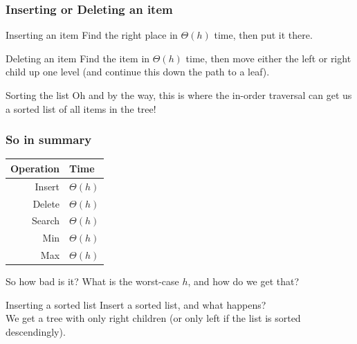\begin{frame}
	\frametitle{Inserting or Deleting an item}

	\begin{block}{Inserting an item}
		Find the right place in $\Theta(h)$ time, then put it there.
	\end{block}	

	\pause
	\begin{block}{Deleting an item}
		Find the item in $\Theta(h)$ time, then move either the left or right child up one level (and continue this down the
		path to a leaf).
	\end{block}	
	\pause
		\begin{block}{Sorting the list}
			Oh and by the way, this is where the in-order traversal can get us a sorted list of all items in the tree!
		\end{block}	
\end{frame}


\begin{frame}
	\frametitle{So in summary}
	\begin{tabular}{r | l}
		Operation & Time \\
		\midrule
		Insert & $\Theta(h)$ \\
		Delete & $\Theta(h)$ \\
		Search & $\Theta(h)$ \\
		Min & $\Theta(h)$ \\
		Max & $\Theta(h)$ \\
	\end{tabular}
	\pause	
	\begin{questionblock}{So how bad is it?}
		What is the worst-case $h$, and how do we get that?
	\end{questionblock}
	\pause
	\begin{answerblock}{Inserting a sorted list}
		Insert a sorted list, and what happens? \\
		\pause 
		We get a tree with only right children (or only left if the list is sorted descendingly).
	\end{answerblock}
	
\end{frame}
